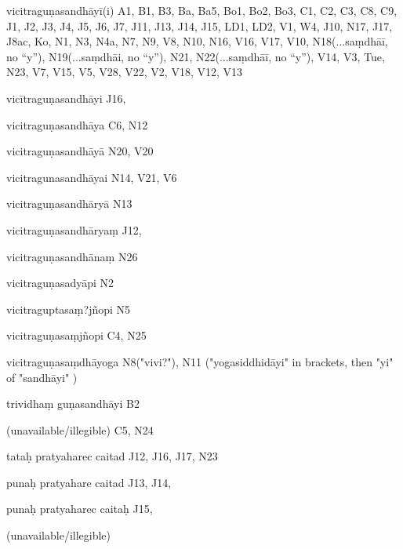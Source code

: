 \begin{ekdosis}
\begin{marma}[hp01_055]
\begin{marma}[hp02_009]
\begin{marma}[hp02_011]
\begin{marma}[hp02_023c]
\item[vicitraguṇasandhāyī(i)] A1, B1, B3, Ba, Ba5, Bo1, Bo2, Bo3, C1, C2, C3, C8, C9, J1, J2, J3, J4, J5, J6, J7, J11, J13, J14, J15, LD1, LD2, V1, W4, J10, N17, J17, J8ac, Ko, N1, N3, N4a, N7, N9, V8, N10, N16, V16, V17, V10, N18(...saṃdhāī, no “y”), N19(...saṃdhāi, no “y”), N21, N22(...saṃdhāī, no “y”), V14, V3, Tue, N23, V7, V15, V5, V28, V22, V2, V18, V12, V13
\item[vicītraguṇasandhāyi] J16,
\item[vicitraguṇasandhāya]  C6, N12
\item[vicitraguṇasandhāyā] N20, V20
\item[vicitragunasandhāyai]  N14, V21, V6
\item[vicitraguṇasandhāryā]  N13
\item[vicitraguṇasandhāryaṃ]  J12,
\item[vicitraguṇasandhānaṃ] N26
\item[vicitraguṇasadyāpi] N2
\item[vicitraguptasaṃ?jñopi] N5
\item[vicitraguṇasaṃjñopi] C4, N25
\item[vicitraguṇasaṃdhāyoga]  N8("vivi?"), N11 ("yogasiddhidāyi" in brackets, then "yi" of "sandhāyi" )
\item[trividhaṃ guṇasandhāyi] B2
\item[(unavailable/illegible)] C5, N24
 \begin{description}

        \end{description}
\end{marma}


\begin{marma}[hp02_24c]
\item[tataḥ pratyaharec caitad] J12, J16, J17, N23
\item[punaḥ pratyahare caitad] J13, J14, 
\item[punaḥ pratyaharec caitaḥ] J15,
\item[(unavailable/illegible)]
 \begin{description}

        \end{description}
\end{marma}



\end{marma}
\end{marma}
\end{marma}
\end{ekdosis}
